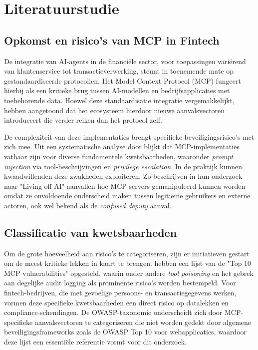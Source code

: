 
\section{Literatuurstudie}%
\label{sec:literatuurstudie}

\subsection{Opkomst en risico's van MCP in Fintech}

De integratie van AI-agents in de financiële sector, voor toepassingen variërend van klantenservice tot transactieverwerking, steunt in toenemende mate op gestandaardiseerde protocollen. Het Model Context Protocol (MCP) fungeert hierbij als een kritieke brug tussen AI-modellen en bedrijfsapplicaties met toebehorende data. Hoewel deze standaardisatie integratie vergemakkelijkt, hebben \textcite{song2025protocolunveilingattackvectors} aangetoond dat het ecosysteem hierdoor nieuwe aanvalsvectoren introduceert die verder reiken dan het protocol zelf.

De complexiteit van deze implementaties brengt specifieke beveiligingsrisico's met zich mee. Uit een systematische analyse door \textcite{guo2025systematicanalysismcpsecurity} blijkt dat MCP-implementaties vatbaar zijn voor diverse fundamentele kwetsbaarheden, waaronder \emph{prompt injection} via tool-beschrijvingen en \emph{privilege escalation}. In de praktijk kunnen kwaadwillenden deze zwakheden exploiteren. Zo beschrijven \textcite{Cato2025} in hun onderzoek naar "Living off AI"-aanvallen hoe MCP-servers gemanipuleerd kunnen worden omdat ze onvoldoende onderscheid maken tussen legitieme gebruikers en externe actoren, ook wel bekend als de \emph{confused deputy} aanval.

\subsection{Classificatie van kwetsbaarheden}

Om de grote hoeveelheid aan risico's te categoriseren, zijn er initiatieven gestart om de meest kritieke lekken in kaart te brengen. \textcite{OWASP2025} hebben een lijst van de "Top 10 MCP vulnerabilities" opgesteld, waarin onder andere \emph{tool poisoning} en het gebrek aan degelijke audit logging als prominente risico's worden bestempeld. Voor fintech-bedrijven, die met gevoelige persoons- en transactiegegevens werken, vormen deze specifieke kwetsbaarheden een direct risico op datalekken en compliance-schendingen. De OWASP-taxonomie onderscheidt zich door MCP-specifieke aanvalsvectoren te categoriseren die niet worden gedekt door algemene beveiligingsframeworks zoals de OWASP Top 10 voor webapplicaties, waardoor deze lijst een essentiële referentie vormt voor dit onderzoek.

